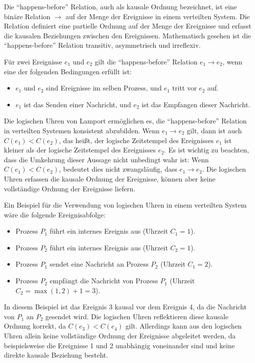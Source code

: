 Die \enquote{happens-before} Relation, auch als kausale Ordnung bezeichnet, ist eine binäre Relation $\to$ auf der Menge der Ereignisse in einem verteilten System. Die Relation definiert eine partielle Ordnung auf der Menge der Ereignisse und erfasst die kausalen Beziehungen zwischen den Ereignissen. Mathematisch gesehen ist die \enquote{happens-before} Relation transitiv, asymmetrisch und irreflexiv.

Für zwei Ereignisse $e_1$ und $e_2$ gilt die \enquote{happens-before} Relation $e_1 \to e_2$, wenn eine der folgenden Bedingungen erfüllt ist:
\begin{itemize}
\item $e_1$ und $e_2$ sind Ereignisse im selben Prozess, und $e_1$ tritt vor $e_2$ auf.
\item $e_1$ ist das Senden einer Nachricht, und $e_2$ ist das Empfangen dieser Nachricht.
\end{itemize}  
Die logischen Uhren von Lamport ermöglichen es, die \enquote{happens-before} Relation in verteilten Systemen konsistent abzubilden. Wenn $e_1 \to e_2$ gilt, dann ist auch $C(e_1) < C(e_2)$, das heißt, der logische Zeitstempel des Ereignisses $e_1$ ist kleiner als der logische Zeitstempel des Ereignisses $e_2$. Es ist wichtig zu beachten, dass die Umkehrung dieser Aussage nicht unbedingt wahr ist: Wenn $C(e_1) < C(e_2)$, bedeutet dies nicht zwangsläufig, dass $e_1 \to e_2$. Die logischen Uhren erfassen die kausale Ordnung der Ereignisse, können aber keine vollständige Ordnung der Ereignisse liefern.

Ein Beispiel für die Verwendung von logischen Uhren in einem verteilten System wäre die folgende Ereignisabfolge:
\begin{itemize}
\item Prozess $P_1$ führt ein internes Ereignis aus (Uhrzeit $C_1 = 1$).
\item Prozess $P_2$ führt ein internes Ereignis aus (Uhrzeit $C_2 = 1$).
\item Prozess $P_1$ sendet eine Nachricht an Prozess $P_2$ (Uhrzeit $C_1 = 2$).
\item Prozess $P_2$ empfängt die Nachricht von Prozess $P_1$ (Uhrzeit $C_2 = \max(1, 2) + 1 = 3$).
\end{itemize}  

In diesem Beispiel ist das Ereignis 3 kausal vor dem Ereignis 4, da die Nachricht von $P_1$ an $P_2$ gesendet wird. Die logischen Uhren reflektieren diese kausale Ordnung korrekt, da $C(e_3) < C(e_4)$ gilt. Allerdings kann aus den logischen Uhren allein keine vollständige Ordnung der Ereignisse abgeleitet werden, da beispielsweise die Ereignisse 1 und 2 unabhängig voneinander sind und keine direkte kausale Beziehung besteht.

